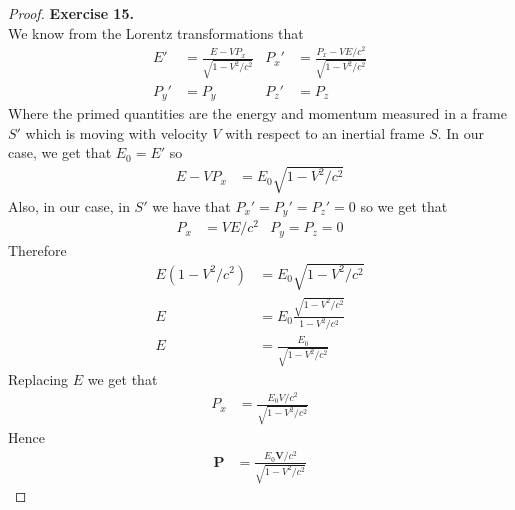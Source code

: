 \documentclass[11pt]{article}
\theoremstyle{definition}
\begin{document}
\cleardoublepage
\begin{proof}{\textbf{Exercise 15.}}\\
We know from the Lorentz transformations that
\begin{align*}
    E' &= \frac{E - VP_x}{\sqrt{1 - V^2/c^2}} &
    P_x' &= \frac{P_x - VE/c^2}{\sqrt{1 - V^2/c^2}}\\
    P_y' &= P_y & P_z' &= P_z
\end{align*}
Where the primed quantities are the energy and momentum measured in a frame
$S'$ which is moving with velocity $V$ with respect to an inertial frame $S$.
In our case, we get that $E_0 = E'$ so
\begin{align*}
    E - VP_x &= E_0 \sqrt{1 - V^2/c^2}
\end{align*}
Also, in our case, in $S'$ we have that $P_x' = P_y' = P_z' = 0$ so we get that
\begin{align*}
    P_x &= VE/c^2 & P_y = P_z = 0
\end{align*}
Therefore
\begin{align*}
    E(1 - V^2/c^2) &= E_0 \sqrt{1 - V^2/c^2} \\
    E &= E_0 \frac{\sqrt{1 - V^2/c^2}}{1 - V^2/c^2} \\
    E &= \frac{E_0}{\sqrt{1 - V^2/c^2}}
\end{align*}
Replacing $E$ we get that
\begin{align*}
    P_x &= \frac{E_0 V/c^2}{\sqrt{1 - V^2/c^2}}
\end{align*}
Hence
\begin{align*}
    \bm{P} &= \frac{E_0 \bm{V}/c^2}{\sqrt{1 - V^2/c^2}}
\end{align*}
\end{proof}
\end{document}
